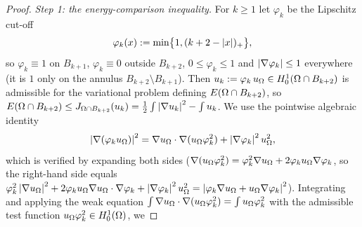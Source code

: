 \begin{proof}
\smallskip
\emph{Step 1: the energy-comparison inequality.}
For $k\ge1$ let $\varphi_k$ be the Lipschitz cut-off
\[
   \varphi_k(x):=\min\bigl\{1,(k+2-\left|x\right|)_+\bigr\},
\]
so $\varphi_k\equiv1$ on $B_{k+1}$, $\varphi_k\equiv0$ outside $B_{k+2}$,
$0\le\varphi_k\le1$ and $\left|\nabla\varphi_k\right|\le1$ everywhere (it is
$1$ only on the annulus $B_{k+2}\setminus B_{k+1}$).
Then
$u_k:=\varphi_k\,u_\Omega\in H^1_0(\Omega\cap B_{k+2})$ is admissible for the
variational problem defining $E(\Omega\cap B_{k+2})$, so
$E(\Omega\cap B_{k+2})\le J_{\Omega\cap B_{k+2}}(u_k)
=\tfrac12\int\left|\nabla u_k\right|^2-\int u_k$.
We use the pointwise algebraic
identity
\[
   \left|\nabla(\varphi_k u_\Omega)\right|^2
   =\nabla u_\Omega\cdot\nabla(u_\Omega\varphi_k^2)
   +\left|\nabla\varphi_k\right|^2u_\Omega^2,
\]
which is verified by expanding both sides
($\nabla(u_\Omega\varphi_k^2)=\varphi_k^2\nabla u_\Omega
+2\varphi_k u_\Omega\nabla\varphi_k$, so the right-hand side equals
$\varphi_k^2\left|\nabla u_\Omega\right|^2+2\varphi_k u_\Omega\nabla u_\Omega\cdot
\nabla\varphi_k+\left|\nabla\varphi_k\right|^2 u_\Omega^2
=\left|\varphi_k\nabla u_\Omega+u_\Omega\nabla\varphi_k\right|^2$).
Integrating and
applying the weak equation
$\int\nabla u_\Omega\cdot\nabla(u_\Omega\varphi_k^2)=\int u_\Omega\varphi_k^2$
with the admissible test function $u_\Omega\varphi_k^2\in H^1_0(\Omega)$, we

\end{proof}
